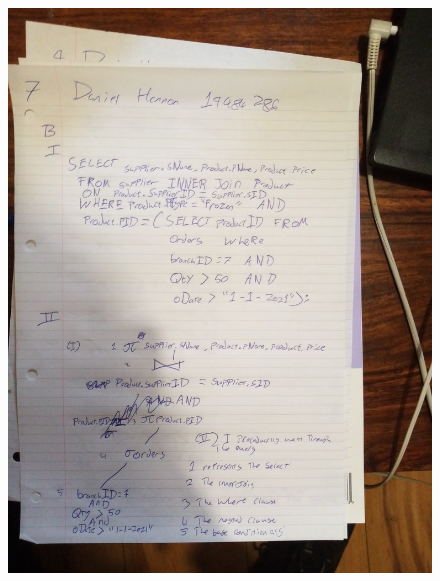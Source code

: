 \documentclass{article}
\begin{document}
	\begin{figure}
		\centering
		\includegraphics[width=\textwidth]{IMG_20210113_113150}
	\end{figure}
	\newpage
\end{document}
